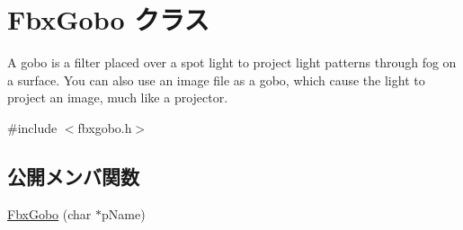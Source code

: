 \hypertarget{class_fbx_gobo}{}\section{Fbx\+Gobo クラス}
\label{class_fbx_gobo}


A gobo is a filter placed over a spot light to project light patterns through fog on a surface. You can also use an image file as a gobo, which cause the light to project an image, much like a projector.  




{\ttfamily \#include $<$fbxgobo.\+h$>$}

\subsection*{公開メンバ関数}
\begin{DoxyCompactItemize}
\item 
\hyperlink{class_fbx_gobo_a2f7f2ac035e00dcc2b89b70b3d317b01}{Fbx\+Gobo} (char $\ast$p\+Name)
\end{DoxyCompactItemize}
